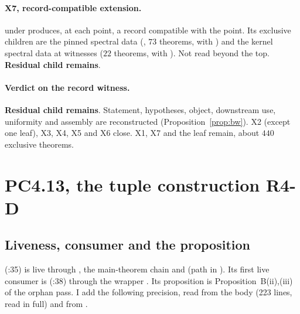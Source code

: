 \documentclass[11pt]{article}
\newcommand{\sR}{\textbf{Residual child remains}}
\theoremstyle{remark}
\begin{document}
\paragraph{X7, record-compatible extension.}  under  produces, at each point, a record compatible with the point. Its exclusive children are the pinned spectral data (, $73$ theorems, with ) and the kernel spectral data at witnesses ($22$ theorems, with ). Not read beyond the top. \sR.

\paragraph{Verdict on the record witness.} \sR. Statement, hypotheses, object, downstream use, uniformity and assembly are reconstructed (Proposition~\ref{prop:bw}). X2 (except one leaf), X3, X4, X5 and X6 close. X1, X7 and the leaf  remain, about $440$ exclusive theorems.

\section{PC4.13, the tuple construction R4-D}\label{sec:r4d}

\subsection{Liveness, consumer and the proposition}

 (:35) is live through , the main-theorem chain and  (path in ). Its first live consumer is  (:38) through the wrapper . Its proposition is Proposition~B(ii),(iii) of the orphan pass. I add the following precision, read from the body (223 lines, read in full) and from .
\end{document}
